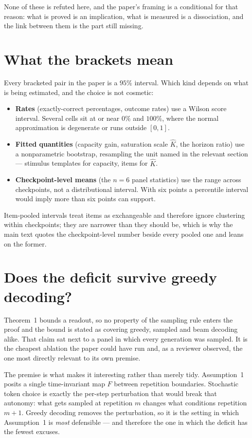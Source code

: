 \documentclass[11pt]{article}
\begin{document}
None of these is refuted here, and the paper's framing is a conditional for that
reason: what is proved is an implication, what is measured is a dissociation, and
the link between them is the part still missing.


\section{What the brackets mean}

Every bracketed pair in the paper is a $95\%$ interval. Which kind depends on
what is being estimated, and the choice is not cosmetic:

\begin{itemize}
\item \textbf{Rates} (exactly-correct percentages, outcome rates) use a Wilson
score interval. Several cells sit at or near $0\%$ and $100\%$, where the
normal approximation is degenerate or runs outside $[0,1]$.
\item \textbf{Fitted quantities} (capacity gain, saturation scale $\hat K$, the
horizon ratio) use a nonparametric bootstrap, resampling the unit named in the
relevant section --- stimulus templates for capacity, items for $\hat K$.
\item \textbf{Checkpoint-level means} (the $n=6$ panel statistics) use the range
across checkpoints, not a distributional interval. With six points a percentile
interval would imply more than six points can support.
\end{itemize}

\noindent Item-pooled intervals treat items as exchangeable and therefore ignore
clustering within checkpoints; they are narrower than they should be, which is
why the main text quotes the checkpoint-level number beside every pooled one and
leans on the former.

\section{Does the deficit survive greedy decoding?}

Theorem~1 bounds a readout, so no property of the sampling rule enters the proof
and the bound is stated as covering greedy, sampled and beam decoding alike. That
claim sat next to a panel in which every generation was sampled. It is the
cheapest ablation the paper could have run and, as a reviewer observed, the one
most directly relevant to its own premise.

The premise is what makes it interesting rather than merely tidy. Assumption~1
posits a single time-invariant map $F$ between repetition boundaries. Stochastic
token choice is exactly the per-step perturbation that would break that
autonomy: what gets sampled at repetition $m$ changes what conditions repetition
$m+1$. Greedy decoding removes the perturbation, so it is the setting in which
Assumption~1 is \emph{most} defensible --- and therefore the one in which the
deficit has the fewest excuses.
\end{document}
